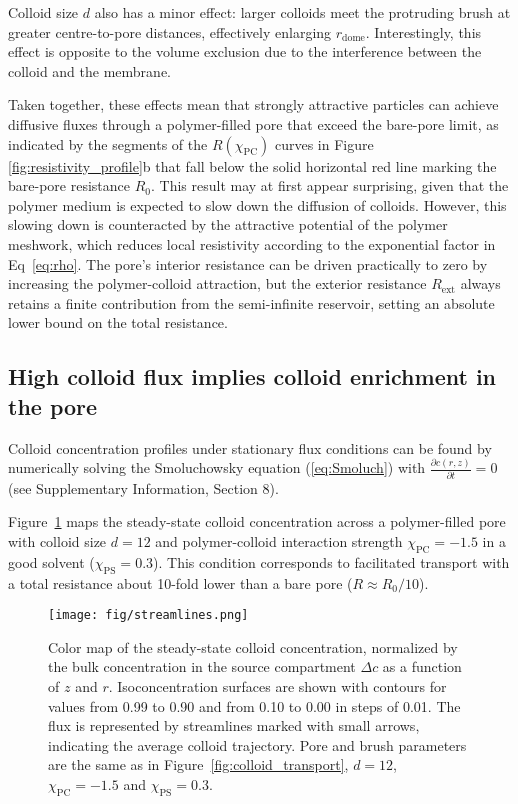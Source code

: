 \documentclass[12pt, a4paper]{article}
\begin{document}
Colloid size $d$ also has a minor effect: larger colloids meet the protruding brush at greater centre-to-pore distances, effectively enlarging $r_{\text{dome}}$.
Interestingly, this effect is opposite to the volume exclusion due to the interference between the colloid and the membrane.

Taken together, these effects mean that strongly attractive particles can achieve diffusive fluxes through a polymer-filled pore that exceed the bare-pore limit, as indicated by the segments of the $R(\chi_{\text{PC}})$ curves in Figure \ref{fig:resistivity_profile}b that fall below the solid horizontal red line marking the bare-pore resistance $R_{0}$.
This result may at first appear surprising, given that the polymer medium is expected to slow down the diffusion of colloids.
However, this slowing down is counteracted by the attractive potential of the polymer meshwork, which reduces local resistivity according to the exponential factor in Eq~\ref{eq:rho}.
The pore's interior resistance can be driven practically to zero by increasing the polymer-colloid attraction, but the exterior resistance $R_{\text{ext}}$ always retains a finite contribution from the semi-infinite reservoir, setting an absolute lower bound on the total resistance.


\subsection{High colloid flux implies colloid enrichment in the pore}

Colloid concentration profiles under stationary flux conditions can be found by numerically solving the Smoluchowsky equation (\ref{eq:Smoluch}) with $\frac{\partial c(r,z)}{\partial t} = 0$  (see Supplementary Information, Section 8). 

Figure~\ref{fig:colloid_concentration} maps the steady-state colloid concentration across a polymer-filled pore with colloid size $d = 12$ and polymer-colloid interaction strength $\chi_{\text{PC}} = -1.5$ in a good solvent ($\chi_{\text{PS}} = 0.3$).
This condition corresponds to facilitated transport with a total resistance about 10-fold lower than a bare pore ($R \approx R_0/10$).

\begin{figure}
    \centering
    \texttt{[image: fig/streamlines.png]}
    \caption{
    Color map of the steady-state colloid concentration, normalized by the bulk concentration in the source compartment $\Delta c$ as a function of $z$ and $r$.
    Isoconcentration surfaces are shown with contours for values from 0.99 to 0.90 and from 0.10 to 0.00 in steps of 0.01.
    The flux is represented by streamlines marked with small arrows, indicating the average colloid trajectory.
    Pore and brush parameters are the same as in Figure~\ref{fig:colloid_transport}, $d = 12$, $\chi_{\text{PC}} = -1.5$ and $\chi_{\text{PS}} = 0.3$.
    }
    \label{fig:colloid_concentration}
\end{figure}
\end{document}
